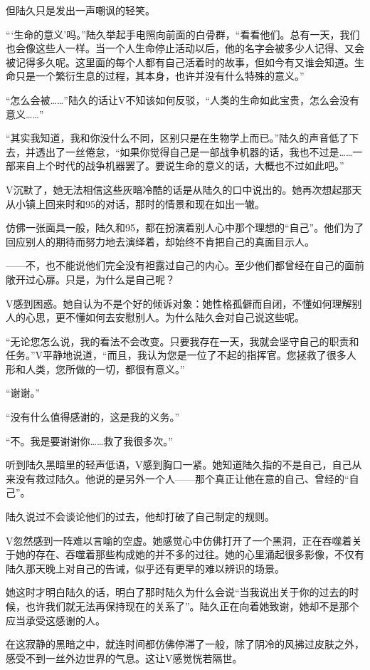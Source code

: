 但陆久只是发出一声嘲讽的轻笑。

“‘生命的意义’吗。”陆久举起手电照向前面的白骨群，“看看他们。总有一天，我们也会像这些人一样。当一个人生命停止活动以后，他的名字会被多少人记得、又会被记得多久呢。这里面的每个人都有自己活着时的故事，但如今有又谁会知道。生命只是一个繁衍生息的过程，其本身，也许并没有什么特殊的意义。”

“怎么会被……”陆久的话让V不知该如何反驳，“人类的生命如此宝贵，怎么会没有意义……”

“其实我知道，我和你没什么不同，区别只是在生物学上而已。”陆久的声音低了下去，并透出了一丝倦怠，“如果你觉得自己是一部战争机器的话，我也不过是……一部来自上个时代的战争机器罢了。要说生命的意义的话，大概也不过如此吧。”

V沉默了，她无法相信这些灰暗冷酷的话是从陆久的口中说出的。她再次想起那天从小镇上回来时和95的对话，那时的情景和现在如出一辙。

仿佛一张面具一般，陆久和95，都在扮演着别人心中那个理想的“自己”。他们为了回应别人的期待而努力地去演绎着，却始终不肯把自己的真面目示人。

——不，也不能说他们完全没有袒露过自己的内心。至少他们都曾经在自己的面前敞开过心扉。只是，为什么是自己呢？

V感到困惑。她自认为不是个好的倾诉对象：她性格孤僻而自闭，不懂如何理解别人的心思，更不懂如何去安慰别人。为什么陆久会对自己说这些呢。

“无论您怎么说，我的看法不会改变。只要我存在一天，我就会坚守自己的职责和任务。”V平静地说道，“而且，我认为您是一位了不起的指挥官。您拯救了很多人形和人类，您所做的一切，都很有意义。”

“谢谢。”

“没有什么值得感谢的，这是我的义务。”

“不。我是要谢谢你……救了我很多次。”

听到陆久黑暗里的轻声低语，V感到胸口一紧。她知道陆久指的不是自己，自己从来没有救过陆久。他说的是另外一个人——那个真正让他在意的自己、曾经的“自己”。

陆久说过不会谈论他们的过去，他却打破了自己制定的规则。

V忽然感到一阵难以言喻的空虚。她感觉心中仿佛打开了一个黑洞，正在吞噬着关于她的存在、吞噬着那些构成她的并不多的过往。她的心里涌起很多影像，不仅有陆久那天晚上对自己的告诫，似乎还有更早的难以辨识的场景。

她这时才明白陆久的话，明白了那时陆久为什么会说“当我说出关于你的过去的时候，也许我们就无法再保持现在的关系了”。陆久正在向着她致谢，她却不是那个应当承受这感谢的人。

在这寂静的黑暗之中，就连时间都仿佛停滞了一般，除了阴冷的风拂过皮肤之外，感受不到一丝外边世界的气息。这让V感觉恍若隔世。

